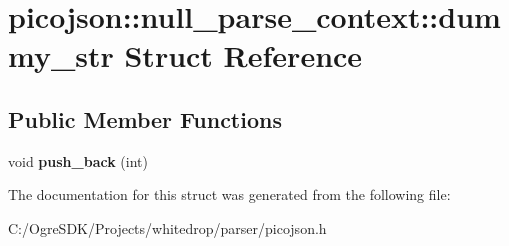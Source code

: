\hypertarget{structpicojson_1_1null__parse__context_1_1dummy__str}{\section{picojson\+:\+:null\+\_\+parse\+\_\+context\+:\+:dummy\+\_\+str Struct Reference}
\label{structpicojson_1_1null__parse__context_1_1dummy__str}
}
\subsection*{Public Member Functions}
\begin{DoxyCompactItemize}
\item 
\hypertarget{structpicojson_1_1null__parse__context_1_1dummy__str_ac2b5c5eca1014b268b4c5a2a87d8923c}{void {\bfseries push\+\_\+back} (int)}\label{structpicojson_1_1null__parse__context_1_1dummy__str_ac2b5c5eca1014b268b4c5a2a87d8923c}

\end{DoxyCompactItemize}


The documentation for this struct was generated from the following file\+:\begin{DoxyCompactItemize}
\item 
C\+:/\+Ogre\+S\+D\+K/\+Projects/whitedrop/parser/picojson.\+h\end{DoxyCompactItemize}
